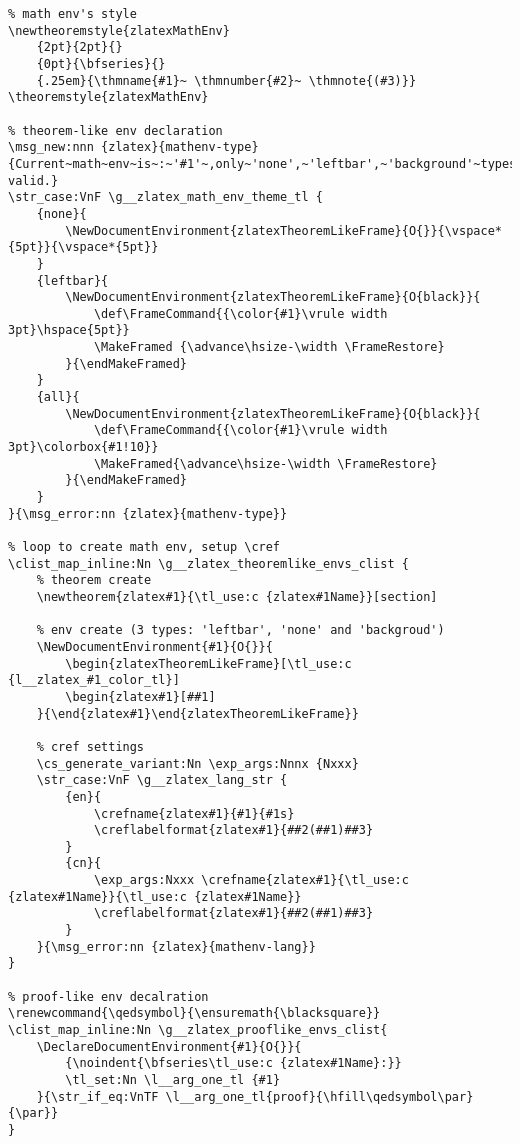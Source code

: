 \begin{verbatim}
% math env's style
\newtheoremstyle{zlatexMathEnv}
    {2pt}{2pt}{}
    {0pt}{\bfseries}{}
    {.25em}{\thmname{#1}~ \thmnumber{#2}~ \thmnote{(#3)}}
\theoremstyle{zlatexMathEnv}

% theorem-like env declaration
\msg_new:nnn {zlatex}{mathenv-type}{Current~math~env~is~:~'#1'~,only~'none',~'leftbar',~'background'~types~are-valid.}
\str_case:VnF \g__zlatex_math_env_theme_tl {
    {none}{
        \NewDocumentEnvironment{zlatexTheoremLikeFrame}{O{}}{\vspace*{5pt}}{\vspace*{5pt}}
    }
    {leftbar}{
        \NewDocumentEnvironment{zlatexTheoremLikeFrame}{O{black}}{
            \def\FrameCommand{{\color{#1}\vrule width 3pt}\hspace{5pt}}
            \MakeFramed {\advance\hsize-\width \FrameRestore}
        }{\endMakeFramed}
    }
    {all}{
        \NewDocumentEnvironment{zlatexTheoremLikeFrame}{O{black}}{
            \def\FrameCommand{{\color{#1}\vrule width 3pt}\colorbox{#1!10}}
            \MakeFramed{\advance\hsize-\width \FrameRestore}
        }{\endMakeFramed}
    }
}{\msg_error:nn {zlatex}{mathenv-type}}

% loop to create math env, setup \cref
\clist_map_inline:Nn \g__zlatex_theoremlike_envs_clist {
    % theorem create
    \newtheorem{zlatex#1}{\tl_use:c {zlatex#1Name}}[section]

    % env create (3 types: 'leftbar', 'none' and 'backgroud')
    \NewDocumentEnvironment{#1}{O{}}{
        \begin{zlatexTheoremLikeFrame}[\tl_use:c {l__zlatex_#1_color_tl}]
        \begin{zlatex#1}[##1]
    }{\end{zlatex#1}\end{zlatexTheoremLikeFrame}}

    % cref settings
    \cs_generate_variant:Nn \exp_args:Nnnx {Nxxx}
    \str_case:VnF \g__zlatex_lang_str {
        {en}{
            \crefname{zlatex#1}{#1}{#1s}
            \creflabelformat{zlatex#1}{##2(##1)##3}
        }
        {cn}{
            \exp_args:Nxxx \crefname{zlatex#1}{\tl_use:c {zlatex#1Name}}{\tl_use:c {zlatex#1Name}}
            \creflabelformat{zlatex#1}{##2(##1)##3}
        }
    }{\msg_error:nn {zlatex}{mathenv-lang}}
}

% proof-like env decalration
\renewcommand{\qedsymbol}{\ensuremath{\blacksquare}}
\clist_map_inline:Nn \g__zlatex_prooflike_envs_clist{
    \DeclareDocumentEnvironment{#1}{O{}}{
        {\noindent{\bfseries\tl_use:c {zlatex#1Name}:}}
        \tl_set:Nn \l__arg_one_tl {#1}
    }{\str_if_eq:VnTF \l__arg_one_tl{proof}{\hfill\qedsymbol\par}{\par}}
}
\end{verbatim}

